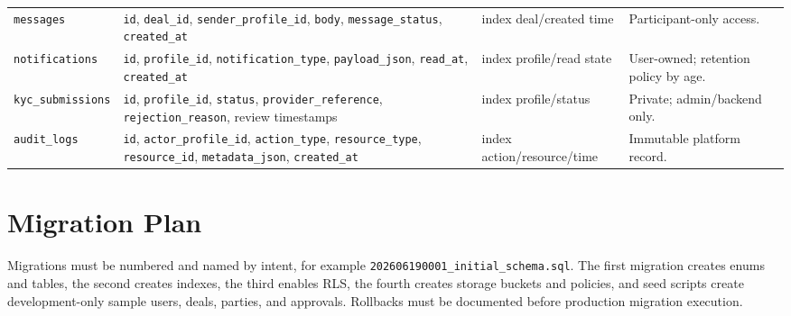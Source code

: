 \begin{longtable}{p{}p{}p{}p{}}
\texttt{messages} & \texttt{id}, \texttt{deal\_id}, \texttt{sender\_profile\_id}, \texttt{body}, \texttt{message\_status}, \texttt{created\_at} & index deal/created time & Participant-only access. \\
\texttt{notifications} & \texttt{id}, \texttt{profile\_id}, \texttt{notification\_type}, \texttt{payload\_json}, \texttt{read\_at}, \texttt{created\_at} & index profile/read state & User-owned; retention policy by age. \\
\texttt{kyc\_submissions} & \texttt{id}, \texttt{profile\_id}, \texttt{status}, \texttt{provider\_reference}, \texttt{rejection\_reason}, review timestamps & index profile/status & Private; admin/backend only. \\
\texttt{audit\_logs} & \texttt{id}, \texttt{actor\_profile\_id}, \texttt{action\_type}, \texttt{resource\_type}, \texttt{resource\_id}, \texttt{metadata\_json}, \texttt{created\_at} & index action/resource/time & Immutable platform record. \\
\bottomrule
\end{longtable}

\section{Migration Plan}
Migrations must be numbered and named by intent, for example \texttt{202606190001\_initial\_schema.sql}. The first migration creates enums and tables, the second creates indexes, the third enables RLS, the fourth creates storage buckets and policies, and seed scripts create development-only sample users, deals, parties, and approvals. Rollbacks must be documented before production migration execution.
